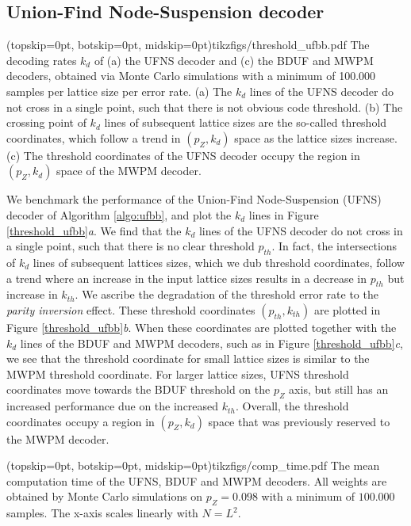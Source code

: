 \subsection{Union-Find Node-Suspension decoder}

\Figure[htb](topskip=0pt, botskip=0pt, midskip=0pt){tikzfigs/threshold_ufbb.pdf}{
  The decoding rates $k_d$ of (a) the UFNS decoder and (c) the BDUF and MWPM decoders, obtained via Monte Carlo simulations with a minimum of 100.000 samples per lattice size per error rate. (a) The $k_d$ lines of the UFNS decoder do not cross in a single point, such that there is not obvious code threshold. (b) The crossing point of $k_d$ lines of subsequent lattice sizes are the so-called threshold coordinates, which follow a trend in $(p_Z, k_d)$ space as the lattice sizes increase. (c) The threshold coordinates of the UFNS decoder occupy the region in $(p_Z, k_d)$ space of the MWPM decoder. \label{threshold_ufbb}}

We benchmark the performance of the Union-Find Node-Suspension (UFNS) decoder of Algorithm \ref{algo:ufbb}, and plot the $k_d$ lines in Figure \ref{threshold_ufbb}\emph{a}. We find that the $k_d$ lines of the UFNS decoder do not cross in a single point, such that there is no clear threshold $p_{th}$. In fact, the intersections of $k_d$ lines of subsequent lattices sizes, which we dub threshold coordinates, follow a trend where an increase in the input lattice sizes results in a decrease in $p_{th}$ but increase in $k_{th}$. We ascribe the degradation of the threshold error rate to the \emph{parity inversion} effect. These threshold coordinates $(p_{th}, k_{th})$ are plotted in Figure \ref{threshold_ufbb}\emph{b}. When these coordinates are plotted together with the $k_d$ lines of the BDUF and MWPM decoders, such as in Figure \ref{threshold_ufbb}\emph{c}, we see that the threshold coordinate for small lattice sizes is similar to the MWPM threshold coordinate. For larger lattice sizes, UFNS threshold coordinates move towards the BDUF threshold on the $p_Z$ axis, but still has an increased performance due on the increased $k_{th}$. Overall, the threshold coordinates occupy a region in $(p_Z, k_d)$ space that was previously reserved to the MWPM decoder. 

\Figure[htb](topskip=0pt, botskip=0pt, midskip=0pt){tikzfigs/comp_time.pdf}{
  The mean computation time of the UFNS, BDUF and MWPM decoders. All weights are obtained by Monte Carlo simulations on $p_Z=0.098$ with a minimum of $100.000$ samples. The x-axis scales linearly with $N = L^2$.\label{comp_time}}

